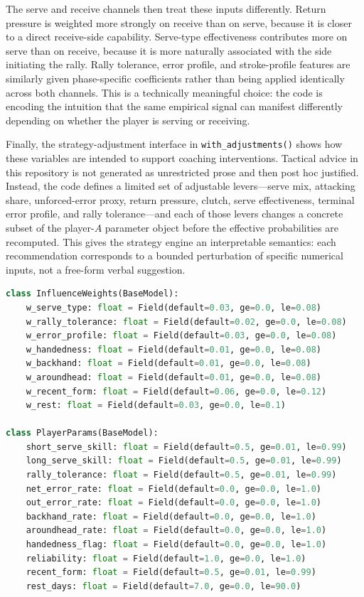 \documentclass{article}
\begin{document}
The serve and receive channels then treat these inputs differently. Return pressure is weighted more strongly on receive than on serve, because it is closer to a direct receive-side capability. Serve-type effectiveness contributes more on serve than on receive, because it is more naturally associated with the side initiating the rally. Rally tolerance, error profile, and stroke-profile features are similarly given phase-specific coefficients rather than being applied identically across both channels. This is a technically meaningful choice: the code is encoding the intuition that the same empirical signal can manifest differently depending on whether the player is serving or receiving.

Finally, the strategy-adjustment interface in \texttt{with\_adjustments()} shows how these variables are intended to support coaching interventions. Tactical advice in this repository is not generated as unrestricted prose and then post hoc justified. Instead, the code defines a limited set of adjustable levers---serve mix, attacking share, unforced-error proxy, return pressure, clutch, serve effectiveness, terminal error profile, and rally tolerance---and each of those levers changes a concrete subset of the player-\(A\) parameter object before the effective probabilities are recomputed. This gives the strategy engine an interpretable semantics: each recommendation corresponds to a bounded perturbation of specific numerical inputs, not a free-form verbal suggestion.

\begin{lstlisting}[style=code,language=Python,caption={Representative fields in the current parameter schema from \texttt{coach/model/params.py}.}]
class InfluenceWeights(BaseModel):
    w_serve_type: float = Field(default=0.03, ge=0.0, le=0.08)
    w_rally_tolerance: float = Field(default=0.02, ge=0.0, le=0.08)
    w_error_profile: float = Field(default=0.03, ge=0.0, le=0.08)
    w_handedness: float = Field(default=0.01, ge=0.0, le=0.08)
    w_backhand: float = Field(default=0.01, ge=0.0, le=0.08)
    w_aroundhead: float = Field(default=0.01, ge=0.0, le=0.08)
    w_recent_form: float = Field(default=0.06, ge=0.0, le=0.12)
    w_rest: float = Field(default=0.03, ge=0.0, le=0.1)

class PlayerParams(BaseModel):
    short_serve_skill: float = Field(default=0.5, ge=0.01, le=0.99)
    long_serve_skill: float = Field(default=0.5, ge=0.01, le=0.99)
    rally_tolerance: float = Field(default=0.5, ge=0.01, le=0.99)
    net_error_rate: float = Field(default=0.0, ge=0.0, le=1.0)
    out_error_rate: float = Field(default=0.0, ge=0.0, le=1.0)
    backhand_rate: float = Field(default=0.0, ge=0.0, le=1.0)
    aroundhead_rate: float = Field(default=0.0, ge=0.0, le=1.0)
    handedness_flag: float = Field(default=0.0, ge=0.0, le=1.0)
    reliability: float = Field(default=1.0, ge=0.0, le=1.0)
    recent_form: float = Field(default=0.5, ge=0.01, le=0.99)
    rest_days: float = Field(default=7.0, ge=0.0, le=90.0)
\end{lstlisting}
\end{document}
